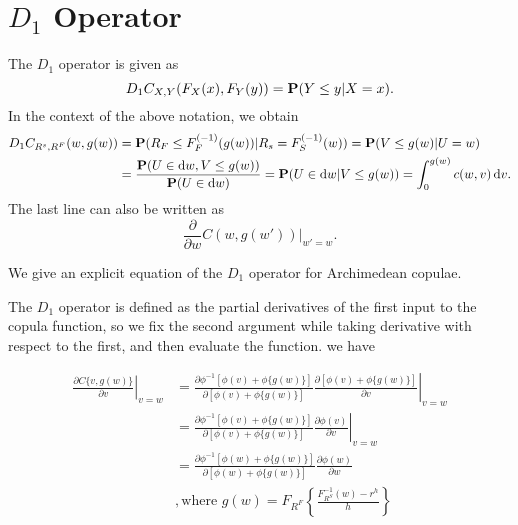 
\section{$D_1$ Operator}

The $D_1$ operator is given as
\begin{equation*}
    D_1 C_{X,Y}(F_X(x), F_Y(y)) = {\bf P}(Y\leq y|X=x).
\end{equation*}
In the context of the above notation, we obtain
\begin{align*}
  D_1 C_{R^s, R^F}(w, g(w)) &= \p(R_F\leq F_{F}^{(-1)}(g(w))|
  R_s=F_S^{(-1)}(w)) %
  = \p(V\leq g(w)| U=w)\\ %
  &= \frac{\p(U\in \dd w, V\leq g(w))} {\p(U\in \dd w)} %
  = \p(U\in \dd w| V\leq g(w)) %
  = \int_0^{g(w)} c(w,v)\, \dd v. 
\end{align*}
The last line can also be written as
\begin{equation*}
  \frac{\partial }{\partial w} C(w, g(w')) \big|_{w'=w}. 
\end{equation*}



We give an explicit equation of the $D_1$ operator for Archimedean copulae.

The $D_1$ operator is defined as the partial derivatives of the first input to the copula function,
so we fix the second argument while taking derivative with respect to the first, and then evaluate the function.
we have

\begin{align}
\left.\frac{\partial C\{v, g(w)\}}{\partial v} \right\vert_{v=w}
&=
\left.\frac{\partial  \phi^{-1}[\phi(v)+\phi\{g(w)\}]}
{\partial  [\phi(v)+\phi\{g(w)\}]}
\frac{\partial  [\phi(v)+\phi\{g(w)\}]}
{\partial  v}
\right\vert_{v=w}\\
&=
\left.\frac{\partial   \phi^{-1}[\phi(v)+\phi\{g(w)\}]}
{\partial [\phi(v)+\phi\{g(w)\}]}
\frac{\partial  \phi(v)}{\partial  v}
\right\vert_{v=w}\\
&=
\frac{\partial \phi^{-1}[\phi(w)+\phi\{g(w)\}]}
{\partial [\phi(w)+\phi\{g(w)\}]}
\frac{\partial  \phi(w)}{\partial  w}\\
&,
\text{where } g(w) = F_{R^F}\left\{\frac{F^{-1}_{R^S}(w)-r^h}{h}\right\}\\
\end{align}

